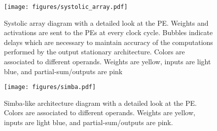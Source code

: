 \begin{figure}[h] %
    \centering
    \texttt{[image: figures/systolic\_array.pdf]} %
    \caption{Systolic array diagram with a detailed look at the PE. Weights and activations are sent to the PEs at every clock cycle. Bubbles indicate delays which are necessary to maintain accuracy of the computations performed by the output stationary architecture. Colors are associated to different operands. Weights are yellow, inputs are light blue, and partial-sum/outputs are pink}
    \label{fig:systolic_array_diagram}

    \vspace{1em} %

    \texttt{[image: figures/simba.pdf]} %
    \caption{Simba-like architecture diagram with a detailed look at the PE. Colors are associated to different operands. Weights are yellow, inputs are light blue, and partial-sum/outputs are pink.}
    \label{fig:simba-like_arch_diagram}
\end{figure}





